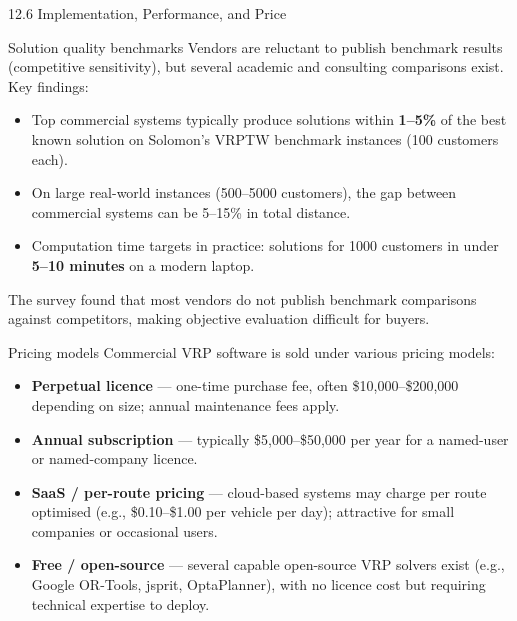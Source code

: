 \documentclass[aspectratio=169,10pt]{beamer}
\begin{document}
\begin{frame}[allowframebreaks]{12.6 \; Implementation, Performance, and Price}
  \begin{block}{Solution quality benchmarks}
    Vendors are reluctant to publish benchmark results (competitive
    sensitivity), but several academic and consulting comparisons exist.
    Key findings:
    \begin{itemize}
      \item Top commercial systems typically produce solutions within
            \textbf{1--5\%} of the best known solution on Solomon's
            VRPTW benchmark instances (100 customers each).
      \item On large real-world instances (500--5000 customers),
            the gap between commercial systems can be 5--15\% in
            total distance.
      \item Computation time targets in practice: solutions for
            1000 customers in under \textbf{5--10 minutes} on a
            modern laptop.
    \end{itemize}
    The survey found that most vendors do not publish benchmark comparisons
    against competitors, making objective evaluation difficult for buyers.
  \end{block}

  \begin{block}{Pricing models}
    Commercial VRP software is sold under various pricing models:
    \begin{itemize}
      \item \textbf{Perpetual licence} --- one-time purchase fee, often
            \$10,000--\$200,000 depending on size; annual maintenance
            fees apply.
      \item \textbf{Annual subscription} --- typically \$5,000--\$50,000
            per year for a named-user or named-company licence.
      \item \textbf{SaaS / per-route pricing} --- cloud-based systems may
            charge per route optimised (e.g., \$0.10--\$1.00 per vehicle
            per day); attractive for small companies or occasional users.
      \item \textbf{Free / open-source} --- several capable open-source
            VRP solvers exist (e.g., Google OR-Tools, jsprit, OptaPlanner),
            with no licence cost but requiring technical expertise to deploy.
    \end{itemize}
  \end{block}

  \framebreak


\end{frame}
\end{document}
